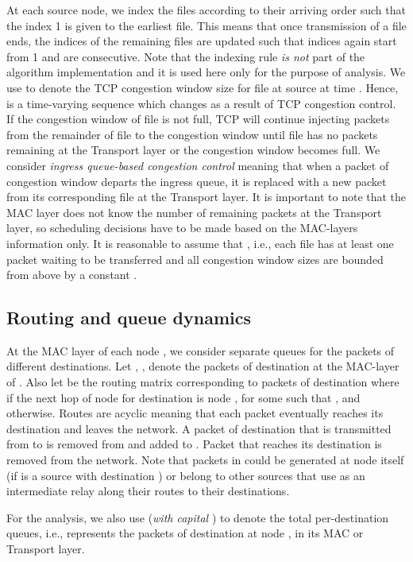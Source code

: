 \documentclass[10pt,onecolumn,draftclsnofoot,journal]{IEEEtran}
\begin{document}
At each source node, we index the files according to their arriving order such that the index 1 is given to the earliest file. This
means that once transmission of a file ends, the indices of the remaining files are updated such that indices again start from 1
and are consecutive. Note that the indexing rule \textit{is not} part of the algorithm implementation and it is used here only for the
purpose of analysis. We use  to denote the TCP congestion window size for file  at source  at time . Hence,  is a time-varying sequence which changes as
a result of TCP congestion control. If the congestion window
of file  is not full, TCP will continue injecting packets from
the remainder of file  to the congestion window until file 
has no packets remaining at the Transport layer or the congestion window becomes full.
We consider \textit{ingress queue-based congestion control} meaning that when a packet of congestion window
departs the ingress queue, it is replaced with a new packet from its corresponding file at the Transport layer.
It is important to note that the MAC layer does not know
the number of remaining packets at the Transport layer, so scheduling decisions have to be made based on the MAC-layers information only.
It is reasonable to assume that , i.e., each file has at least one packet waiting to be transferred and all congestion window sizes are bounded from above by a constant .
\subsection*{Routing and queue dynamics}
At the MAC layer of each node , we consider separate queues for the packets of different destinations. Let , , denote the packets of destination  at the MAC-layer of . Also let  be the routing matrix corresponding to packets of destination  where  if the next hop of node  for destination  is node , for some  such that , and  otherwise. Routes are acyclic meaning that each packet eventually reaches its destination and leaves the network. A packet of destination  that is transmitted from  to  is removed from  and added to . Packet that reaches its destination is removed from the network. Note that packets in  could be generated at node  itself (if  is a source with destination ) or belong to other sources that use  as an intermediate relay along their routes to their destinations.

For the analysis, we also use  (\textit{with capital }) to denote the total per-destination queues, i.e.,  represents the packets of destination  at node , in its MAC or Transport layer.
\end{document}
